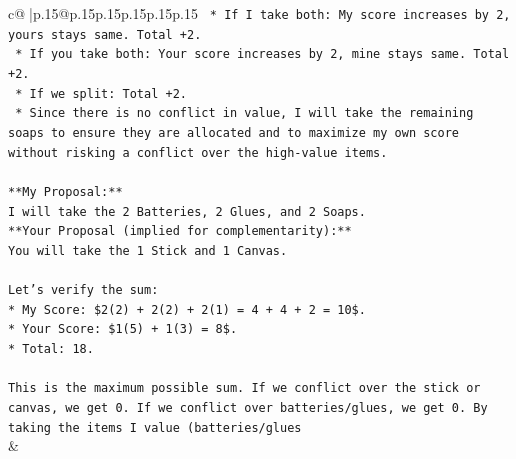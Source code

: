 \documentclass{article}
\begin{document}
{\begin{supertabular}{c@{$\;$}|p{.15\linewidth}@{}p{.15\linewidth}p{.15\linewidth}p{.15\linewidth}p{.15\linewidth}p{.15\linewidth}}
{{{\texttt{    *   If I take both: My score increases by 2, yours stays same. Total +2.} \\
\texttt{    *   If you take both: Your score increases by 2, mine stays same. Total +2.} \\
\texttt{    *   If we split: Total +2.} \\
\texttt{    *   Since there is no conflict in value, I will take the remaining soaps to ensure they are allocated and to maximize my own score without risking a conflict over the high{-}value items.} \\
\\ 
\texttt{**My Proposal:**} \\
\texttt{I will take the 2 Batteries, 2 Glues, and 2 Soaps.} \\
\texttt{**Your Proposal (implied for complementarity):**} \\
\texttt{You will take the 1 Stick and 1 Canvas.} \\
\\ 
\texttt{Let's verify the sum:} \\
\texttt{*   My Score: \$2(2) + 2(2) + 2(1) = 4 + 4 + 2 = 10\$.} \\
\texttt{*   Your Score: \$1(5) + 1(3) = 8\$.} \\
\texttt{*   Total: 18.} \\
\\ 
\texttt{This is the maximum possible sum. If we conflict over the stick or canvas, we get 0. If we conflict over batteries/glues, we get 0. By taking the items I value (batteries/glues} \\
            }
        }
    }
    & \\ \\


\end{supertabular}}
\end{document}
